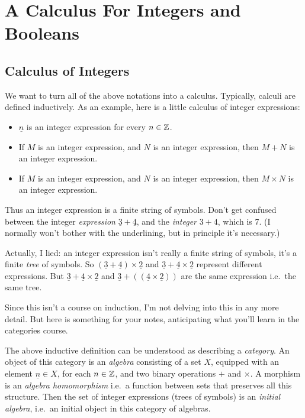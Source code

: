 \documentclass[runningheads,12pt]{llncs}
\begin{document}
\section{A Calculus For Integers and Booleans}
\subsection{Calculus of Integers}

We want to turn all of the above notations into a calculus.  Typically, calculi are defined inductively.  As an example, here is a little calculus of integer expressions:
\begin{itemize}
\item $\underline{n}$ is an integer expression for every $n \in \mathbb{Z}$.
\item If $M$ is an integer expression, and $N$ is an integer expression, then $M + N$ is an integer expression.
\item  If $M$ is an integer expression, and $N$ is an integer expression, then $M \times N$ is an integer expression.
\end{itemize}
Thus an integer expression is a finite string of symbols.  Don't get confused between the integer \emph{expression} $\underline{3} + \underline{4}$, and the \emph{integer} $3+4$, which is 7.  (I normally won't bother with the underlining, but in principle it's necessary.)

Actually, I lied: an integer expression isn't really a finite string of symbols, it's a finite \emph{tree} of symbols.  So $(\underline{3}+\underline{4}) \times \underline{2}$ and $\underline{3} + \underline{4} \times \underline{2}$ represent different expressions.  But $\underline{3}+ \underline{4} \times \underline{2}$ and $\underline{3} + ((\underline{4} \times \underline{2}))$ are the same expression i.e.\ the same tree.

\begin{remark}
  Since this isn't a course on induction, I'm not delving into this in any more detail.  But here is  something for your notes, anticipating what you'll learn in the categories course. 

The above inductive definition can be understood as describing a \emph{category}.  An object of this category is an \emph{algebra} consisting of a set $X$, equipped with an element $\underline{n} \in X$, for each $n \in \mathbb{Z}$, and two binary operations $+$ and $\times$.  A morphism is an \emph{algebra homomorphism} i.e.\ a function between sets that preserves all this structure.  Then the set of integer expressions (trees of symbols) is an \emph{initial algebra}, i.e.\ an initial object in this category of algebras.  
\end{remark}
\end{document}
